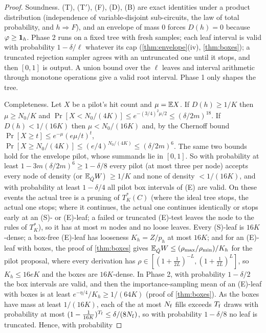 \begin{proof}
Soundness. (T), (T$'$), (F), (D), (B) are exact identities under a product
distribution (independence of variable-disjoint sub-circuits, the law of total
probability, and $h\Rightarrow F$), and an envelope of mass $0$ forces $D(h)=0$
because $\varphi\ge\mathbf{1}_h$. Phase 2 runs on a fixed tree with fresh samples; each
leaf interval is valid with probability $1-\delta/\ell$ whatever its cap
(\cref{thm:envelope}(iv), \cref{thm:boxes}); a truncated rejection sampler agrees
with an untruncated one until it stops, and then $[0,1]$ is output. A union bound
over the $\ell$ leaves and interval arithmetic through monotone operations give a
valid root interval. Phase 1 only shapes the tree.

Completeness. Let $X$ be a pilot's hit count and $\mu=\mathbb{E} X$. If $D(h)\ge1/K$ then
$\mu\ge N_0/K$ and $\Pr[X<N_0/(4K)]\le e^{-(3/4)^2\mu/2}\le(\delta/2m)^{18}$. If
$D(h)<1/(16K)$ then $\mu<N_0/(16K)$ and, by the Chernoff bound
$\Pr[X\ge t]\le e^{-\mu}(e\mu/t)^t$, $\Pr[X\ge N_0/(4K)]\le(e/4)^{N_0/(4K)}\le(\delta/2m)^{6}$.
The same two bounds hold for the envelope pilot, whose summands lie in $[0,1]$. So
with probability at least $1-3m(\delta/2m)^6\ge1-\delta/8$ every pilot (at most three
per node) accepts every node of density (or $\mathbb{E}_{\hat Q}W$) $\ge1/K$ and none of
density $<1/(16K)$, and with probability at least $1-\delta/4$ all pilot box intervals
of (E) are valid. On these events the actual tree is a pruning of $T^*_K(C)$ (where
the ideal tree stops, the actual one stops; where it continues, the actual one
continues identically or stops early at an (S)- or (E)-leaf; a failed or truncated
(E)-test leaves the node to the rules of $T^*_K$), so it has at most $m$ nodes and
no loose leaves.
Every (S)-leaf is $16K$-dense; a box-free (E)-leaf has looseness $K_h=Z/p_h$ at most
$16K$; and for an (E)-leaf with boxes, the proof of \cref{thm:boxes} gives
$\mathbb{E}_{\hat Q}W\le(\rho_{\max}/\rho_{\min})/K_h$ for the pilot proposal, where every
derivation has $\rho\in[(1+\frac1{2L})^{-L},(1+\frac1{2L})^{L}]$, so $K_h\le16eK$ and
the boxes are $16K$-dense. In Phase 2, with probability $1-\delta/2$ the box intervals
are valid, and then the importance-sampling mean of an (E)-leaf with boxes is at
least $e^{-\eta/4}/K_h\ge1/(64K)$ (proof of \cref{thm:boxes}). As the boxes have mass at
least $1/(16K)$, each of the at most $N_{\rm f}$ fills exceeds $T_{\rm f}$ draws with
probability at most $(1-\frac1{16K})^{T_{\rm f}}\le\delta/(8N_{\rm f})$, so with
probability $1-\delta/8$ no leaf is truncated. Hence, with probability

\end{proof}
